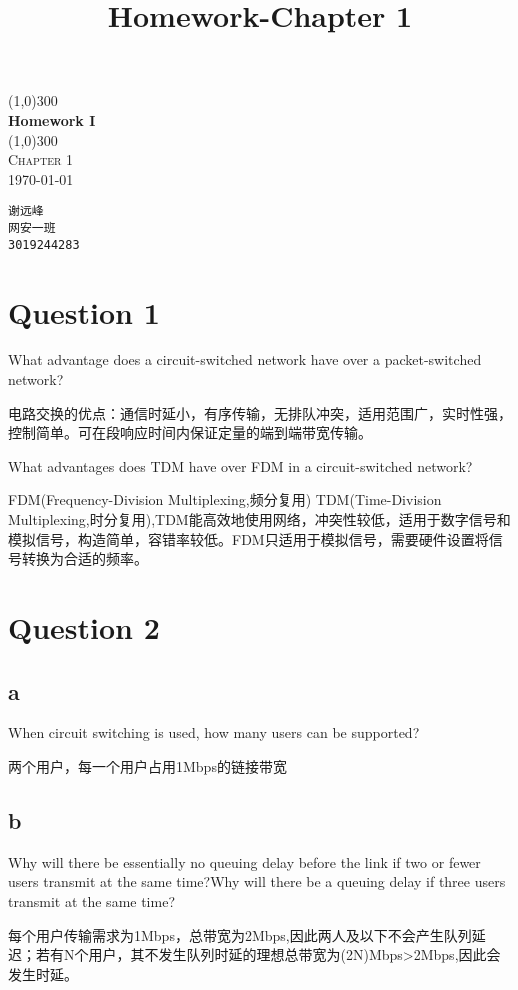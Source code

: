 \documentclass[UTF8]{article}
\title{Homework-Chapter 1}
\begin{document}
\begin{titlepage}
    \begin{center}
        \line(1,0){300}\\
        [0.65cm]
        \huge{\bfseries Homework I }\\
        \line(1,0){300}\\
        \textsc{\Large Chapter 1}\\
        \textnormal{\Large \today}\\
        [5.5cm]
    \end{center}
    \begin{flushright}
        \texttt{\Large 谢远峰\\网安一班\\3019244283}\\
        [0.5cm]
    \end{flushright}
\end{titlepage}

\section*{Question 1}
What advantage does a circuit-switched network have over a packet-switched network? \par
电路交换的优点：通信时延小，有序传输，无排队冲突，适用范围广，实时性强，控制简单。可在段响应时间内保证定量的端到端带宽传输。\par
What advantages does TDM have over FDM in a circuit-switched network? \par
FDM(Frequency-Division Multiplexing,频分复用) TDM(Time-Division Multiplexing,时分复用),TDM能高效地使用网络，冲突性较低，适用于数字信号和模拟信号，构造简单，容错率较低。FDM只适用于模拟信号，需要硬件设置将信号转换为合适的频率。
\section*{Question 2}
\subsection*{a}
When circuit switching is used, how many users can be supported?\par
两个用户，每一个用户占用1Mbps的链接带宽
\subsection*{b}
Why will there be essentially no queuing delay before the link if two or fewer users transmit at the same time?Why will there be a queuing delay if three users transmit at the same time? \par
每个用户传输需求为1Mbps，总带宽为2Mbps,因此两人及以下不会产生队列延迟；若有N个用户，其不发生队列时延的理想总带宽为(2N)Mbps>2Mbps,因此会发生时延。
\end{document}
